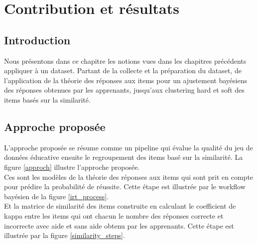 
\chapter{Contribution et résultats}
\minitoc
\thispagestyle{empty}
\newpage

\section{Introduction}
Nous présentons dans ce chapitre les notions vues dans les chapitres précédents appliquer à un dataset. Partant de la collecte et la préparation du dataset, de l’application de la théorie des réponses aux items pour un ajustement bayésiens des réponses obtenues par les apprenants, jusqu’aux clustering hard et soft des items basés sur la similarité.
\section{Approche proposée}
L’approche proposée se résume comme un pipeline qui évalue la qualité du jeu de données éducative ensuite le regroupement des items basé sur la similarité. La figure \ref{approch} illustre l’approche proposée. \\
Ces sont les modèles de la théorie des réponses aux items qui sont prit en compte pour prédire la probabilité de réussite. Cette étape est illustrée par le workflow bayésien de la figure \ref{irt_process}. \\
Et la matrice de similarité des items construite en calculant le coefficient de kappa entre les items qui ont chacun le nombre des réponses correcte et incorrecte avec aide et sans aide obtenu par les apprenants. Cette étape est illustrée par la figure \ref{similarity_steps}. \\

\newpage

